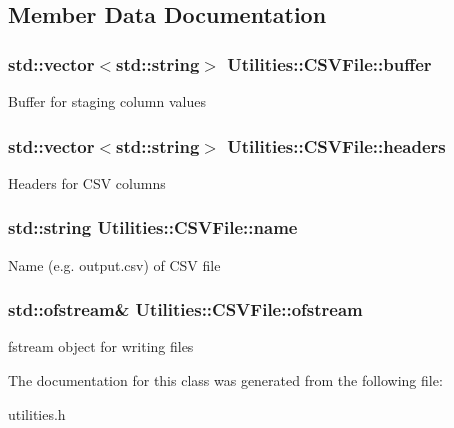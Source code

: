 \subsection{Member Data Documentation}
\subsubsection[{\texorpdfstring{buffer}{buffer}}]{\setlength{\rightskip}{0pt plus 5cm}std\+::vector$<$std\+::string$>$ Utilities\+::\+C\+S\+V\+File\+::buffer}\hypertarget{classUtilities_1_1CSVFile_aa1ab5bfb37837aaba9b6cabd38c96bb3}{}\label{classUtilities_1_1CSVFile_aa1ab5bfb37837aaba9b6cabd38c96bb3}
Buffer for staging column values 
\subsubsection[{\texorpdfstring{headers}{headers}}]{\setlength{\rightskip}{0pt plus 5cm}std\+::vector$<$std\+::string$>$ Utilities\+::\+C\+S\+V\+File\+::headers}\hypertarget{classUtilities_1_1CSVFile_a17822ae335f168e68498b8b1b69b8dbe}{}\label{classUtilities_1_1CSVFile_a17822ae335f168e68498b8b1b69b8dbe}
Headers for C\+SV columns 
\subsubsection[{\texorpdfstring{name}{name}}]{\setlength{\rightskip}{0pt plus 5cm}std\+::string Utilities\+::\+C\+S\+V\+File\+::name}\hypertarget{classUtilities_1_1CSVFile_a26f01db1cc36f242adf00b17b4f63e37}{}\label{classUtilities_1_1CSVFile_a26f01db1cc36f242adf00b17b4f63e37}
Name (e.\+g. output.\+csv) of C\+SV file 
\subsubsection[{\texorpdfstring{ofstream}{ofstream}}]{\setlength{\rightskip}{0pt plus 5cm}std\+::ofstream\& Utilities\+::\+C\+S\+V\+File\+::ofstream}\hypertarget{classUtilities_1_1CSVFile_a3ceb6ad218bb1e729b03a51e326fc12b}{}\label{classUtilities_1_1CSVFile_a3ceb6ad218bb1e729b03a51e326fc12b}
fstream object for writing files 

The documentation for this class was generated from the following file\+:\begin{DoxyCompactItemize}
\item 
utilities.\+h\end{DoxyCompactItemize}
